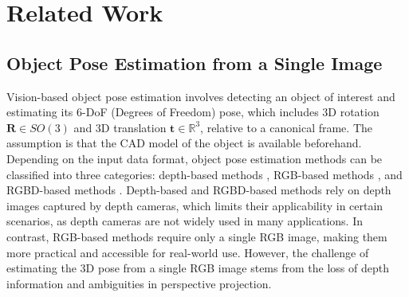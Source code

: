 \section{Related Work}
\label{sec:Related}

\subsection{Object Pose Estimation from a Single Image}

Vision-based object pose estimation involves detecting an object of interest and estimating its 6-DoF (Degrees of Freedom) pose, which includes 3D rotation $\mathbf{R} \in SO(3)$ and 3D translation $\mathbf{t} \in \mathbb{R}^3$, relative to a canonical frame. The assumption is that the CAD model of the object is available beforehand. Depending on the input data format, object pose estimation methods can be classified into three categories: depth-based methods \DIFdelbegin {}\DIFdelend \DIFaddbegin {}\DIFaddend , RGB-based methods \cite{billings2019silhonet, peng2019pvnet, wang2021gdr}, and RGBD-based methods \cite{wang2019densefusion, he2020pvn3d, hong2024rdpn6d}. Depth-based and RGBD-based methods rely on depth images captured by depth cameras, which limits their applicability in certain scenarios, as depth cameras are not widely used in many applications. In contrast, RGB-based methods require only a single RGB image, making them more practical and accessible for real-world use. However, the challenge of estimating the 3D pose from a single RGB image stems from the loss of depth information and ambiguities in perspective projection.


